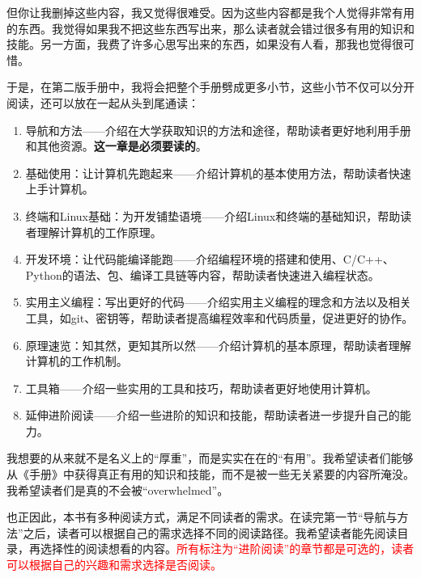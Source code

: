 但你让我删掉这些内容，我又觉得很难受。因为这些内容都是我个人觉得非常有用的东西。我觉得如果我不把这些东西写出来，那么读者就会错过很多有用的知识和技能。另一方面，我费了许多心思写出来的东西，如果没有人看，那我也觉得很可惜。

于是，在第二版手册中，我将会把整个手册劈成更多小节，这些小节不仅可以分开阅读，还可以放在一起从头到尾通读：
\begin{enumerate}
  \item 导航和方法——介绍在大学获取知识的方法和途径，帮助读者更好地利用手册和其他资源。\textbf{这一章是必须要读的}。
  \item 基础使用：让计算机先跑起来——介绍计算机的基本使用方法，帮助读者快速上手计算机。
  \item 终端和Linux基础：为开发铺垫语境——介绍Linux和终端的基础知识，帮助读者理解计算机的工作原理。
  \item 开发环境：让代码能编译能跑——介绍编程环境的搭建和使用、C/C++、Python的语法、包、编译工具链等内容，帮助读者快速进入编程状态。
  \item 实用主义编程：写出更好的代码——介绍实用主义编程的理念和方法以及相关工具，如git、密钥等，帮助读者提高编程效率和代码质量，促进更好的协作。
  \item 原理速览：知其然，更知其所以然——介绍计算机的基本原理，帮助读者理解计算机的工作机制。
  \item 工具箱——介绍一些实用的工具和技巧，帮助读者更好地使用计算机。
  \item 延伸进阶阅读——介绍一些进阶的知识和技能，帮助读者进一步提升自己的能力。
\end{enumerate}

我想要的从来就不是名义上的“厚重”，而是实实在在的“有用”。我希望读者们能够从《手册》中获得真正有用的知识和技能，而不是被一些无关紧要的内容所淹没。我希望读者们是真的不会被“overwhelmed”。

也正因此，本书有多种阅读方式，满足不同读者的需求。在读完第一节“导航与方法”之后，读者可以根据自己的需求选择不同的阅读路径。我希望读者能先阅读目录，再选择性的阅读想看的内容。\textcolor{red}{所有标注为“进阶阅读”的章节都是可选的，读者可以根据自己的兴趣和需求选择是否阅读。}

